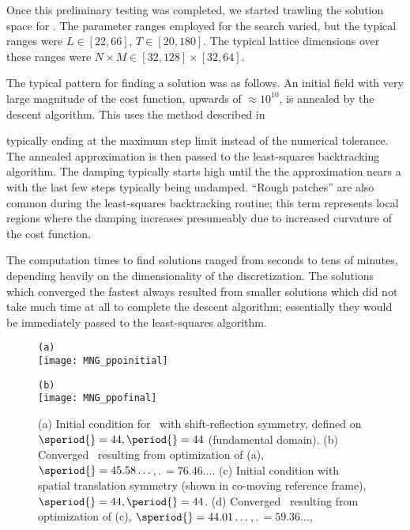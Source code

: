 \begin{itemize}
{Once this preliminary testing was completed, we started trawling the solution space
for \twots. The parameter ranges employed for the search varied, but the typical ranges were
$L \in [22, 66]$, $T \in [20, 180]$. The typical lattice dimensions over these ranges
were $N\times M \in [32, 128] \times [32, 64]$.

The typical pattern for finding a solution was as follows. An initial field with very
large magnitude of the cost function, upwards of $\approx 10^{10}$, is annealed by the descent
algorithm.
This uses the method described in %


 typically ending at the maximum step limit instead of the numerical
tolerance. The annealed approximation is then passed
to the least-squares backtracking algorithm. The damping
typically starts high until the the approximation nears a \twot with
the last few steps typically being undamped.
``Rough patches'' are also common during the least-squares
backtracking routine; this term represents local regions where the damping increases
presumeably due to increased curvature of the cost function.

The computation times to find solutions ranged from seconds to tens of minutes, depending
heavily on the dimensionality of the discretization. The solutions which converged the fastest always resulted
from smaller solutions which did not take much time at all to complete the descent algorithm;
essentially they would be immediately passed to the least-squares algorithm.


\begin{figure}
\begin{minipage}[height=.05\textheight]{.5\textwidth}
\centering
\small{\texttt{(a)}} \\
\texttt{[image: MNG\_ppoinitial]}
\end{minipage}
\begin{minipage}[height=.2\textheight]{.5\textwidth}
\centering
\small{\texttt{(b)}} \\
\texttt{[image: MNG\_ppofinal]}
\end{minipage}

\caption{ \label{fig:ppo1}
(a) Initial condition for \twot\ with shift-reflection symmetry, defined on
$\speriod{}=44,\period{}=44$ (fundamental domain). (b) Converged \twot\
resulting from optimization of (a), $\speriod{}= 45.58\dots$,$\period{}= 76.46\dots$.
(c) Initial condition with spatial translation symmetry (shown in co-moving reference frame),
$\speriod{}=44,\period{}=44$. (d) Converged \twot\ resulting from optimization
of (c), $\speriod{} = 44.01\dots$,$\period{}=59.36\dots$,}
\end{figure}

}
\end{itemize}
